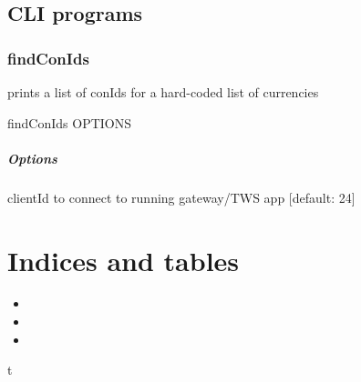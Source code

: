 \documentclass[letterpaper,10pt,english]{sphinxmanual}
\begin{document}
\section{CLI programs}
\label{\detokenize{trading.scripts:cli-programs}}

\subsection{findConIds}
\label{\detokenize{trading.scripts:findconids}}
prints a list of conIds for a hard-coded list of currencies

%
\begin{sphinxVerbatim}[commandchars=\\\{\}]
findConIds \PYG{o}{[}OPTIONS\PYG{o}{]}
\end{sphinxVerbatim}
\paragraph{Options}

\begin{fulllineitems}
\label{\detokenize{trading.scripts:cmdoption-findconids-c}}
clientId to connect to running gateway/TWS app  {[}default: 24{]}

\end{fulllineitems}



\chapter{Indices and tables}
\label{\detokenize{index:indices-and-tables}}\begin{itemize}
\item {} 

\item {} 

\item {} 

\end{itemize}


\renewcommand{\indexname}{Python Module Index}
\begin{sphinxtheindex}
\def\bigletter#1{{\Large\sffamily#1}\nopagebreak\vspace{1mm}}
\bigletter{t}
\item {}
\item {}
\item {}
\end{sphinxtheindex}

\renewcommand{\indexname}{Index}
\printindex
\end{document}
